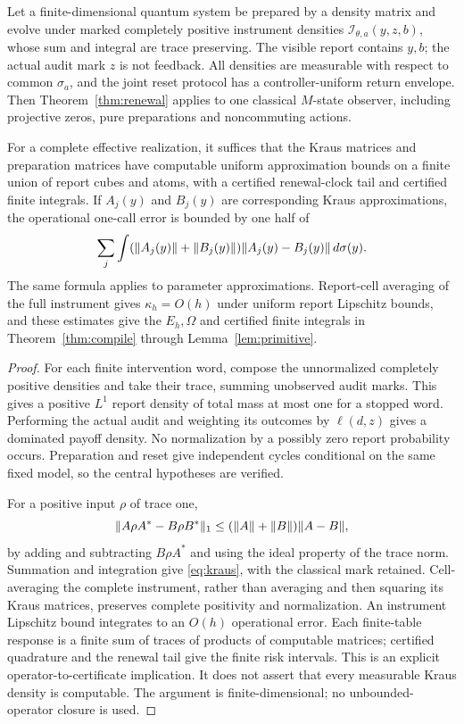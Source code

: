 \begin{theorem}\label{thm:quantum}
Let a finite-dimensional quantum system be prepared by a density matrix and evolve under marked completely positive instrument densities
$\mathcal I_{\theta,a}(y,z,b)$, whose sum and integral are trace preserving. The visible report contains $y,b$; the actual audit mark $z$ is not feedback. All densities are measurable with respect to common $\sigma_a$, and the joint reset protocol has a controller-uniform return envelope. Then Theorem~\ref{thm:renewal} applies to one classical $M$-state observer, including projective zeros, pure preparations and noncommuting actions.

For a complete effective realization, it suffices that the Kraus matrices and preparation matrices have computable uniform approximation bounds on a finite union of report cubes and atoms, with a certified renewal-clock tail and certified finite integrals. If $A_j(y)$ and $B_j(y)$ are corresponding Kraus approximations, the operational one-call error is bounded by one half of
\begin{equation}\label{eq:kraus}
 \sum_j\int (\lVert A_j(y)\rVert+\lVert B_j(y)\rVert)
                       \lVert A_j(y)-B_j(y)\rVert\,d\sigma(y).
\end{equation}
The same formula applies to parameter approximations. Report-cell averaging of the full instrument gives $\kappa_h=O(h)$ under uniform report Lipschitz bounds, and these estimates give the $E_h,\Omega$ and certified finite integrals in Theorem~\ref{thm:compile} through Lemma~\ref{lem:primitive}.
\end{theorem}
\begin{proof}
For each finite intervention word, compose the unnormalized completely positive densities and take their trace, summing unobserved audit marks. This gives a positive $L^1$ report density of total mass at most one for a stopped word. Performing the actual audit and weighting its outcomes by $\ell(d,z)$ gives a dominated payoff density. No normalization by a possibly zero report probability occurs. Preparation and reset give independent cycles conditional on the same fixed model, so the central hypotheses are verified.

For a positive input $\rho$ of trace one,
\[
 \lVert A\rho A^*-B\rho B^*\rVert_1
 \le(\lVert A\rVert+\lVert B\rVert)\lVert A-B\rVert,
\]
by adding and subtracting $B\rho A^*$ and using the ideal property of the trace norm. Summation and integration give \eqref{eq:kraus}, with the classical mark retained. Cell-averaging the complete instrument, rather than averaging and then squaring its Kraus matrices, preserves complete positivity and normalization. An instrument Lipschitz bound integrates to an $O(h)$ operational error. Each finite-table response is a finite sum of traces of products of computable matrices; certified quadrature and the renewal tail give the finite risk intervals. This is an explicit operator-to-certificate implication. It does not assert that every measurable Kraus density is computable. The argument is finite-dimensional; no unbounded-operator closure is used.
\end{proof}

